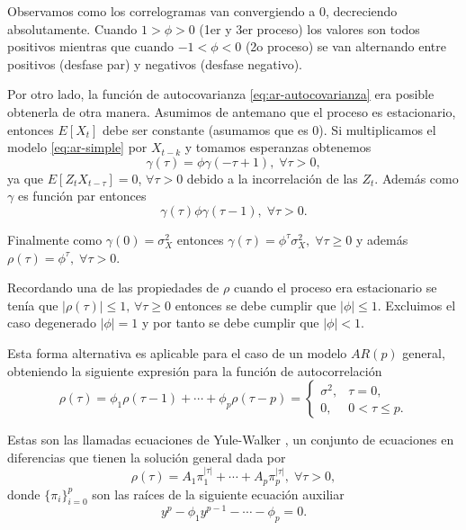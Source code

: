 Observamos como los correlogramas van convergiendo a 0, decreciendo absolutamente. Cuando $1 > \phi > 0$ (1er y 3er proceso) los valores son todos positivos mientras que cuando $-1 < \phi < 0$ (2o proceso) se van alternando entre positivos (desfase par) y negativos (desfase negativo).

Por otro lado, la función de autocovarianza \eqref{eq:ar-autocovarianza} era posible obtenerla de otra manera. Asumimos de antemano que el proceso es estacionario, entonces $E[X_t]$ debe ser constante (asumamos que es 0). Si multiplicamos el modelo \eqref{eq:ar-simple} por $X_{t-k}$ y tomamos esperanzas obtenemos
\begin{equation*}
  \gamma(\tau) = \phi \gamma(-\tau + 1), \; \forall \tau > 0,
  \label{eq:ar-truco}
\end{equation*}
ya que $E[Z_t X_{t-\tau}] = 0$, $\forall \tau > 0$ debido a la incorrelación de las $Z_t$. Además como $\gamma$ es función par entonces
\begin{equation*}
  \gamma(\tau) \phi \gamma(\tau - 1), \; \forall \tau > 0.
  \label{eq:ar-truco2}
\end{equation*}

Finalmente como $\gamma(0) = \sigma^2_X$ entonces $\gamma(\tau) = \phi^\tau \sigma^2_X, \; \forall \tau \geq 0$ y además $\rho(\tau) = \phi^\tau, \; \forall \tau > 0$.

Recordando una de las propiedades de $\rho$ cuando el proceso era estacionario se tenía que $|\rho(\tau)| \leq 1, \, \forall \tau \geq 0$ entonces se debe cumplir que $|\phi| \leq 1$. Excluimos el caso degenerado $|\phi| = 1$ y por tanto se debe cumplir que $|\phi| < 1$.

Esta forma alternativa es aplicable para el caso de un modelo $AR(p)$ general, obteniendo la siguiente expresión para la función de autocorrelación
\begin{equation}
  \rho(\tau) = \phi_1 \rho(\tau - 1) + \cdots + \phi_p \rho(\tau - p) =
  \begin{cases}
    \sigma^2, & \tau = 0, \\
    0, & 0 < \tau \leq p.
  \end{cases}
  \label{eq:ar-general}
\end{equation}

Estas son las llamadas ecuaciones de Yule-Walker \cite{yule1971method, walker1931periodicity}, un conjunto de ecuaciones en diferencias que tienen la solución general dada por
\begin{equation}
  \rho(\tau) = A_1 \pi_1^{|\tau|} + \cdots + A_p \pi_p^{|\tau|}, \; \forall \tau > 0,
  \label{eq:sol-general}
\end{equation}
donde $\{\pi_i\}_{i = 0}^p$ son las raíces de la siguiente ecuación auxiliar
\begin{equation*}
  y^p - \phi_1 y^{p-1} - \cdots - \phi_p = 0.
  \label{eq:sol-auxiliar}
\end{equation*}

